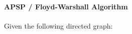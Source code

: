 \textbf{\LARGE{\color{tumgadRed}APSP / Floyd-Warshall Algorithm}}\\
\\
\noindent
Given the following directed graph:
